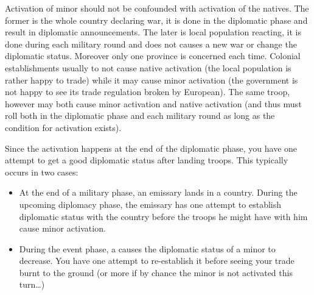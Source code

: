 \aparag Activation of \ROTW minor should not be confounded with
activation of the natives.
\bparag The former is the whole country declaring war, it is done in the
diplomatic phase and result in diplomatic announcements.
\bparag The later is local population reacting, it is done during each
military round and does not causes a new war or change the diplomatic
status. Moreover only one province is concerned each time.
\bparag Colonial establishments usually to not cause native activation
(the local population is rather happy to trade) while it may cause minor
activation (the government is not happy to see its trade regulation
broken by European).
\bparag The same troop, however may both cause minor activation and
native activation (and thus must roll both in the diplomatic phase and
each military round as long as the condition for activation exists).

\begin{designnote}
  Since the activation happens at the end of the diplomatic phase, you
  have one attempt to get a good diplomatic status after landing
  troops. This typically occurs in two cases:
  \begin{itemize}
  \item At the end of a military phase, an emissary lands in a
    country. During the upcoming diplomacy phase, the emissary has one
    attempt to establish diplomatic status with the country before the
    troops he might have with him cause minor activation.
  \item During the event phase, a \RD causes the diplomatic status of a
    \ROTW minor to decrease. You have one attempt to re-establish it
    before seeing your trade burnt to the ground (or more if by chance
    the minor is not activated this turn\ldots)
  \end{itemize}
\end{designnote}

